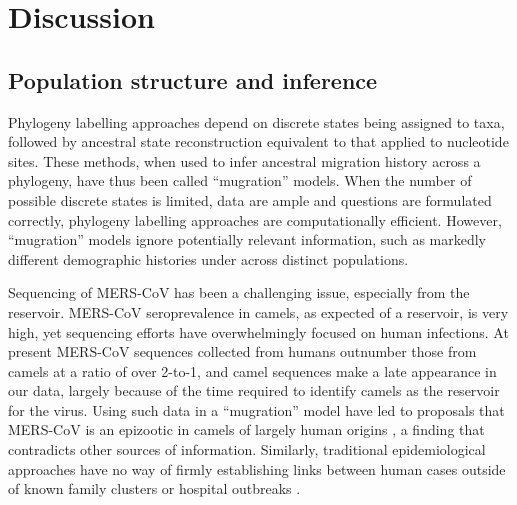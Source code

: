 \documentclass[11pt,oneside,letterpaper]{article}
\begin{document}







\section*{Discussion}

\subsection{Population structure and inference}
Phylogeny labelling approaches depend on discrete states being assigned to taxa, followed by ancestral state reconstruction equivalent to that applied to nucleotide sites.
These methods, when used to infer ancestral migration history across a phylogeny, have thus been called ``mugration'' models.
When the number of possible discrete states is limited, data are ample and questions are formulated correctly, phylogeny labelling approaches are computationally efficient.
However, ``mugration'' models ignore potentially relevant information, such as markedly different demographic histories under across distinct populations.

Sequencing of MERS-CoV has been a challenging issue, especially from the reservoir.
MERS-CoV seroprevalence in camels, as expected of a reservoir, is very high, yet sequencing efforts have overwhelmingly focused on human infections.
At present MERS-CoV sequences collected from humans outnumber those from camels at a ratio of over 2-to-1, and camel sequences make a late appearance in our data, largely because of the time required to identify camels as the reservoir for the virus.
Using such data in a ``mugration'' model have led to proposals that MERS-CoV is an epizootic in camels of largely human origins \citep{zhang_evolutionary_2016}, a finding that contradicts other sources of information.
Similarly, traditional epidemiological approaches have no way of firmly establishing links between human cases outside of known family clusters or hospital outbreaks \citep{cauchemez_unraveling_2016}.
\end{document}
